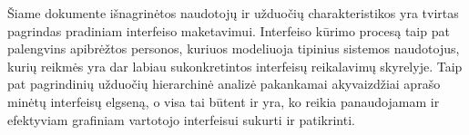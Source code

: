 Šiame dokumente išnagrinėtos naudotojų ir užduočių charakteristikos yra tvirtas pagrindas
pradiniam interfeiso maketavimui. Interfeiso kūrimo procesą taip pat palengvins apibrėžtos
personos, kuriuos modeliuoja tipinius sistemos naudotojus, kurių reikmės yra dar labiau
sukonkretintos interfeisų reikalavimų skyrelyje. Taip pat pagrindinių užduočių hierarchinė
analizė pakankamai akyvaizdžiai aprašo minėtų interfeisų elgseną, o visa tai būtent ir yra, ko
reikia panaudojamam ir efektyviam grafiniam vartotojo interfeisui sukurti ir patikrinti.
